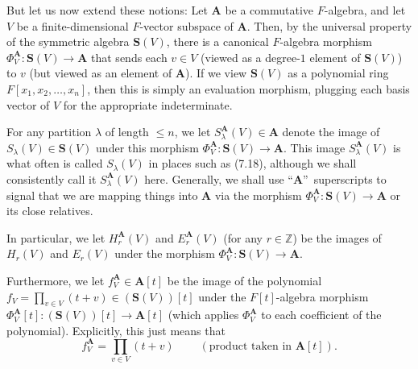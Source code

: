 \documentclass[numbers=enddot,12pt,final,onecolumn,notitlepage]{scrartcl}%
\theoremstyle{definition}
\let\prodnonlimits\prod
\renewcommand{\prod}{\prodnonlimits\limits}
\begin{document}
\begin{enumerate}
But let us now extend these notions: Let $\mathbf{A}$ be a commutative
$F$-algebra, and let $V$ be a finite-dimensional $F$-vector subspace of
$\mathbf{A}$. Then, by the universal property of the symmetric algebra
$\mathbf{S}\left(  V\right)  $, there is a canonical $F$-algebra morphism
$\Phi_{V}^{\mathbf{A}}:\mathbf{S}\left(  V\right)  \rightarrow\mathbf{A}$ that
sends each $v\in V$ (viewed as a degree-$1$ element of $\mathbf{S}\left(
V\right)  $) to $v$ (but viewed as an element of $\mathbf{A}$). If we view
$\mathbf{S}\left(  V\right)  $ as a polynomial ring $F\left[  x_{1}%
,x_{2},\ldots,x_{n}\right]  $, then this is simply an evaluation morphism,
plugging each basis vector of $V$ for the appropriate indeterminate.

For any partition $\lambda$ of length $\leq n$, we let $S_{\lambda
}^{\mathbf{A}}\left(  V\right)  \in\mathbf{A}$ denote the image of
$S_{\lambda}\left(  V\right)  \in\mathbf{S}\left(  V\right)  $ under this
morphism $\Phi_{V}^{\mathbf{A}}:\mathbf{S}\left(  V\right)  \rightarrow
\mathbf{A}$. This image $S_{\lambda}^{\mathbf{A}}\left(  V\right)  $ is what
often is called $S_{\lambda}\left(  V\right)  $ in places such as (7.18),
although we shall consistently call it $S_{\lambda}^{\mathbf{A}}\left(
V\right)  $ here. Generally, we shall use \textquotedblleft$\mathbf{A}%
$\textquotedblright\ superscripts to signal that we are mapping things into
$\mathbf{A}$ via the morphism $\Phi_{V}^{\mathbf{A}}:\mathbf{S}\left(
V\right)  \rightarrow\mathbf{A}$ or its close relatives.

In particular, we let $H_{r}^{\mathbf{A}}\left(  V\right)  $ and
$E_{r}^{\mathbf{A}}\left(  V\right)  $ (for any $r\in\mathbb{Z}$) be the
images of $H_{r}\left(  V\right)  $ and $E_{r}\left(  V\right)  $ under the
morphism $\Phi_{V}^{\mathbf{A}}:\mathbf{S}\left(  V\right)  \rightarrow
\mathbf{A}$.

Furthermore, we let $f_{V}^{\mathbf{A}}\in\mathbf{A}\left[  t\right]  $ be the
image of the polynomial $f_{V}=\prod_{v\in V}\left(  t+v\right)  \in\left(
\mathbf{S}\left(  V\right)  \right)  \left[  t\right]  $ under the $F\left[
t\right]  $-algebra morphism $\Phi_{V}^{\mathbf{A}}\left[  t\right]  :\left(
\mathbf{S}\left(  V\right)  \right)  \left[  t\right]  \rightarrow
\mathbf{A}\left[  t\right]  $ (which applies $\Phi_{V}^{\mathbf{A}}$ to each
coefficient of the polynomial). Explicitly, this just means that%
\begin{equation}
f_{V}^{\mathbf{A}}=\prod_{v\in V}\left(  t+v\right)
\ \ \ \ \ \ \ \ \ \ \left(  \text{product taken in }\mathbf{A}\left[
t\right]  \right)  . \label{p26.fAV}%
\end{equation}



\end{enumerate}
\end{document}
